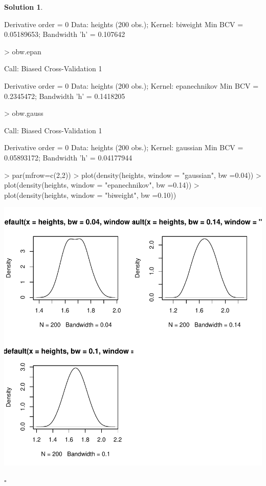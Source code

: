 \documentclass[twoside]{article}
\theoremstyle{definition}
\newtheorem*{solutionT}{Solution}
\newenvironment{solution}{\begin{cBox}\begin{solutionT}}{\hfill{\scriptsize\ensuremath{\square}}\end{solutionT}\end{cBox}}
\theoremstyle{definition}
\begin{document}
\begin{enumerate}
\begin{solution}
\begin{Schunk}
\begin{Soutput}
Derivative order = 0
Data: heights (200 obs.);	Kernel: biweight
Min BCV = 0.05189653;	Bandwidth 'h' = 0.107642
\end{Soutput}
\begin{Sinput}
> obw.epan
\end{Sinput}
\begin{Soutput}
Call:		Biased Cross-Validation 1

Derivative order = 0
Data: heights (200 obs.);	Kernel: epanechnikov
Min BCV = 0.2345472;	Bandwidth 'h' = 0.1418205
\end{Soutput}
\begin{Sinput}
> obw.gauss
\end{Sinput}
\begin{Soutput}
Call:		Biased Cross-Validation 1

Derivative order = 0
Data: heights (200 obs.);	Kernel: gaussian
Min BCV = 0.05893172;	Bandwidth 'h' = 0.04177944
\end{Soutput}
\end{Schunk}
\begin{Schunk}
\begin{Sinput}
> par(mfrow=c(2,2))
> plot(density(heights, window = "gaussian", bw =0.04))
> plot(density(heights, window = "epanechnikov", bw =0.14))
> plot(density(heights, window = "biweight", bw =0.10))
\end{Sinput}
\end{Schunk}
\includegraphics{week3-011}


\end{solution}
\end{enumerate}
\end{document}
